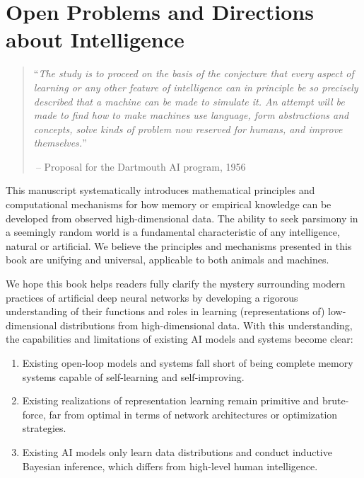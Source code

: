 \documentclass[../../book-main.tex]{subfiles}
\begin{document}
\chapter{Open Problems and Directions about Intelligence}
\label{ch:future}

\begin{quote}
    ``\textit{The study is to proceed on the basis of the conjecture
        that every aspect of learning or any other feature of
        intelligence can in principle be so precisely described that a
        machine can be made to simulate it. An attempt will be made to
        find how to make machines use language, form abstractions and
        concepts, solve kinds of problem now reserved for humans, and
    improve themselves.}''

    $~$\hfill -- Proposal for the Dartmouth AI program, 1956
\end{quote}
\vspace{5mm}

This manuscript systematically introduces mathematical principles and
computational mechanisms for how memory or empirical knowledge can be developed from observed high-dimensional data. 
The ability to seek parsimony in a seemingly random world is a fundamental characteristic of any
intelligence, natural or artificial. We believe the principles and
mechanisms presented in this book are unifying and universal, applicable to both animals and machines.

We hope this book helps readers fully clarify the mystery surrounding
modern practices of artificial deep neural networks by developing a
rigorous understanding of their functions and roles in learning (representations of) 
low-dimensional distributions from high-dimensional data. With this
understanding, the capabilities and limitations of existing AI models
and systems become clear:
\begin{enumerate}
    \item Existing open-loop models and systems fall short of being complete memory systems capable 
    of self-learning and self-improving.
    \item Existing realizations of representation learning remain primitive and brute-force, 
    far from optimal in terms of network architectures or optimization strategies.
    \item Existing AI models only learn data distributions and
    conduct inductive Bayesian inference, which differs from high-level human intelligence.
\end{enumerate}
\end{document}
